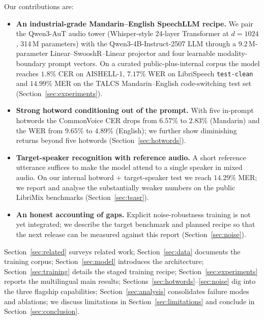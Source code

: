Our contributions are:

\begin{itemize}
  \item \textbf{An industrial-grade Mandarin--English SpeechLLM recipe.} We pair
        the Qwen3-AuT audio tower (Whisper-style 24-layer Transformer
        at $d{=}1024$, 314\,M parameters) with the
        Qwen3-4B-Instruct-2507 \cite{qwen2025qwen3} LLM through a
        9.2\,M-parameter Linear--SwooshR--Linear projector
        \cite{yao2024zipformer} and four learnable modality-boundary
        prompt vectors. On a curated public-plus-internal corpus the
        model reaches $1.8$\% CER on AISHELL-1, $7.17$\% WER on
        LibriSpeech \texttt{test-clean} and $14.99$\% MER on the TALCS
        Mandarin--English code-switching test set \cite{li2022talcs}
        (Section~\ref{sec:experiments}).
  \item \textbf{Strong hotword conditioning out of the prompt.} With
        five in-prompt hotwords the CommonVoice CER drops from $6.57$\%
        to $2.83$\% (Mandarin) and the WER from $9.65$\% to $4.89$\%
        (English); we further show diminishing returns beyond five
        hotwords (Section~\ref{sec:hotwords}).
  \item \textbf{Target-speaker recognition with reference audio.} A
        short reference utterance suffices to make the model attend to a
        single speaker in mixed audio. On our internal hotword + target-speaker
        test we reach $14.29$\% MER; we report and analyse the
        substantially weaker numbers on the public LibriMix benchmarks
        (Section~\ref{sec:tsasr}).
  \item \textbf{An honest accounting of gaps.} Explicit
        noise-robustness training is not yet integrated; we describe the
        target benchmark and planned recipe so that the next release can
        be measured against this report
        (Section~\ref{sec:noise}).
\end{itemize}

Section~\ref{sec:related} surveys related work; Section~\ref{sec:data}
documents the training corpus; Section~\ref{sec:model} introduces the
architecture; Section~\ref{sec:training} details the staged training
recipe; Section~\ref{sec:experiments} reports the multilingual main
results; Sections~\ref{sec:hotwords}--\ref{sec:noise} dig into the three
flagship capabilities; Section~\ref{sec:analysis} consolidates failure
modes and ablations; we discuss limitations in
Section~\ref{sec:limitations} and conclude in
Section~\ref{sec:conclusion}.
